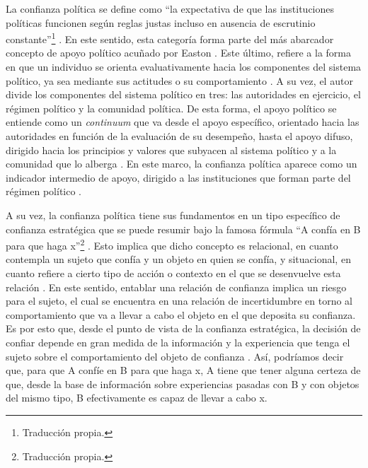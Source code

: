 \documentclass[12pt,twoside]{templates/facsothesis}
\begin{document}
La confianza política se define como ``la expectativa de que las instituciones políticas funcionen según reglas justas incluso en ausencia de escrutinio constante''\footnote{Traducción propia.} \citep[p.16]{marienMeasuringPoliticalTrust2013}. En este sentido, esta categoría forma parte del más abarcador concepto de apoyo político acuñado por Easton \citetext{\citeyear{eastonSystemsAnalysisPolitical1965}; \citeyear{eastonReassessmentConceptPolitical1975}}. Este último, refiere a la forma en que un individuo se orienta evaluativamente hacia los componentes del sistema político, ya sea mediante sus actitudes o su comportamiento \citep{eastonReassessmentConceptPolitical1975}. A su vez, el autor divide los componentes del sistema político en tres: las autoridades en ejercicio, el régimen político y la comunidad política. De esta forma, el apoyo político se entiende como un \emph{continuum} que va desde el apoyo específico, orientado hacia las autoridades en función de la evaluación de su desempeño, hasta el apoyo difuso, dirigido hacia los principios y valores que subyacen al sistema político y a la comunidad que lo alberga \citep{eastonReassessmentConceptPolitical1975, norrisDemocraticDeficitCritical2011}. En este marco, la confianza política aparece como un indicador intermedio de apoyo, dirigido a las instituciones que forman parte del régimen político \citep{vandermeerDeeplyRootedConcern2017, zmerliPoliticalTrust2022}.

A su vez, la confianza política tiene sus fundamentos en un tipo específico de confianza estratégica que se puede resumir bajo la famosa fórmula ``A confía en B para que haga x''\footnote{Traducción propia.} \citep[p.26]{hardinWeWantTrust1999}. Esto implica que dicho concepto es relacional, en cuanto contempla un sujeto que confía y un objeto en quien se confía, y situacional, en cuanto refiere a cierto tipo de acción o contexto en el que se desenvuelve esta relación \citep{citrinPoliticalTrustCynical2018, vandermeerEconomicPerformancePolitical2018, vandermeerDeeplyRootedConcern2017}. En este sentido, entablar una relación de confianza implica un riesgo para el sujeto, el cual se encuentra en una relación de incertidumbre en torno al comportamiento que va a llevar a cabo el objeto en el que deposita su confianza. Es por esto que, desde el punto de vista de la confianza estratégica, la decisión de confiar depende en gran medida de la información y la experiencia que tenga el sujeto sobre el comportamiento del objeto de confianza \citep{uslanerMoralFoundationsTrust2002, uslanerStudyTrust2017}. Así, podríamos decir que, para que A confíe en B para que haga x, A tiene que tener alguna certeza de que, desde la base de información sobre experiencias pasadas con B y con objetos del mismo tipo, B efectivamente es capaz de llevar a cabo x.
\end{document}
